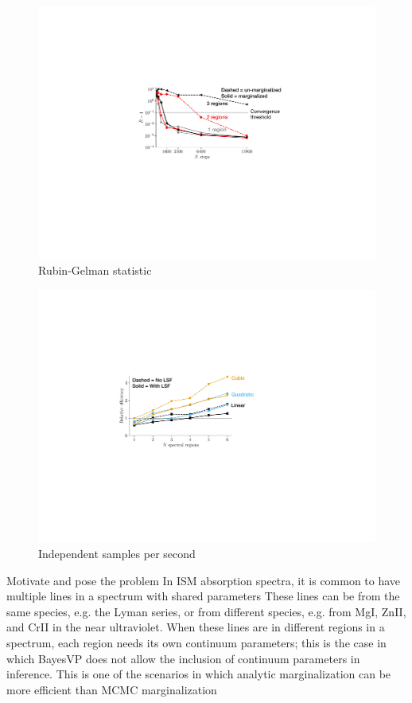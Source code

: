\documentclass[manuscript]{aastex62}
\begin{document}
\begin{figure}
  \includegraphics{convergence.pdf}
  \caption{Rubin-Gelman statistic}
  \label{fig:convergence-comparison}
\end{figure}

\begin{figure}
  \includegraphics{efficiency.pdf}
  \caption{Independent samples per second}
  \label{fig:efficiency-comparison}
\end{figure}

Motivate and pose the problem
In ISM absorption spectra, it is common to have multiple lines in a spectrum with shared parameters
These lines can be from the same species, e.g. the Lyman series, or from different species, e.g. from Mg\small{I}, Zn\small{II}, and Cr\small{II} in the near ultraviolet.
When these lines are in different regions in a spectrum, each region needs its own continuum parameters; this is the case in which BayesVP does not allow the inclusion of continuum parameters in inference.
This is one of the scenarios in which analytic marginalization can be more efficient than MCMC marginalization
\end{document}
